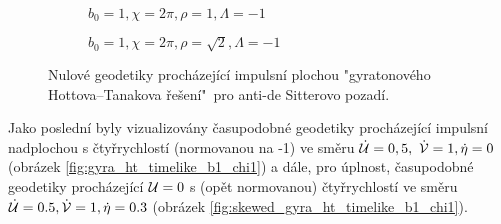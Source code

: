\begin{figure}[H]
\begin{subfigure}[b]{0.48\textwidth}
        \caption{$b_0=1, \chi=2\pi, \rho=1, \Lambda = -1$}
    \end{subfigure}
    \hfill
    \begin{subfigure}[b]{0.48\textwidth}
        \caption{$b_0=1, \chi=2\pi, \rho=\sqrt{2}, \Lambda = -1$}
    \end{subfigure}
    \caption{Nulové geodetiky procházející impulsní plochou "gyratonového Hottova--Tanakova řešení"\ pro anti-de Sitterovo pozadí.}
    \label{fig:gyra_ht_null_b1_chi12_lmb-1}
\end{figure}

Jako poslední byly vizualizovány časupodobné geodetiky procházející impulsní nadplochou s čtyřrychlostí (normovanou na -1) ve směru $\dot {\mathcal{U}} = 0,5,~ \dot {\mathcal{V}} = 1, \dot \eta = 0$ (obrázek \ref{fig:gyra_ht_timelike_b1_chi1}) a dále, pro úplnost, časupodobné
geodetiky procházející $\mathcal{U} = 0$ s (opět normovanou) čtyřrychlostí ve směru $\dot {\mathcal{U}} = 0.5, \dot {\mathcal{V}} = 1, \dot \eta = 0.3$ (obrázek \ref{fig:skewed_gyra_ht_timelike_b1_chi1}).


